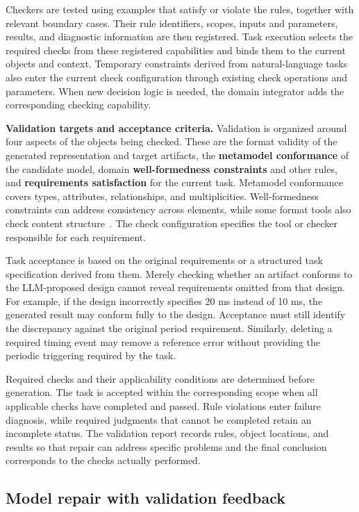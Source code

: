 \documentclass[pdflatex,iicol,sn-mathphys-num]{sn-jnl}
\newcommand{\paperref}[1]{~\citep{#1}}
\begin{document}
Checkers are tested using examples that satisfy or violate the rules, together with relevant boundary cases. Their rule identifiers, scopes, inputs and parameters, results, and diagnostic information are then registered. Task execution selects the required checks from these registered capabilities and binds them to the current objects and context. Temporary constraints derived from natural-language tasks also enter the current check configuration through existing check operations and parameters. When new decision logic is needed, the domain integrator adds the corresponding checking capability.


\textbf{Validation targets and acceptance criteria.} Validation is organized around four aspects of the objects being checked. These are the format validity of the generated representation and target artifacts, the \textbf{metamodel conformance} of the candidate model, domain \textbf{well-formedness constraints} and other rules, and \textbf{requirements satisfaction} for the current task. Metamodel conformance covers types, attributes, relationships, and multiplicities. Well-formedness constraints can address consistency across elements, while some format tools also check content structure\paperref{W3C2004XMLSchemaStructures}. The check configuration specifies the tool or checker responsible for each requirement.


Task acceptance is based on the original requirements or a structured task specification derived from them. Merely checking whether an artifact conforms to the LLM-proposed design cannot reveal requirements omitted from that design. For example, if the design incorrectly specifies 20 ms instead of 10 ms, the generated result may conform fully to the design. Acceptance must still identify the discrepancy against the original period requirement. Similarly, deleting a required timing event may remove a reference error without providing the periodic triggering required by the task.


Required checks and their applicability conditions are determined before generation. The task is accepted within the corresponding scope when all applicable checks have completed and passed. Rule violations enter failure diagnosis, while required judgments that cannot be completed retain an incomplete status. The validation report records rules, object locations, and results so that repair can address specific problems and the final conclusion corresponds to the checks actually performed.


\subsection{Model repair with validation feedback}\label{sec:method-3-7}
\end{document}
